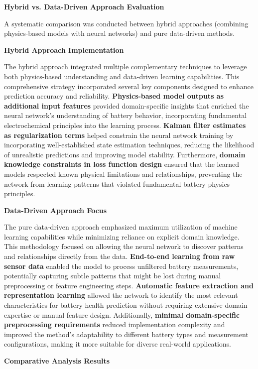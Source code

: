\textbf{Hybrid vs. Data-Driven Approach Evaluation}

A systematic comparison was conducted between hybrid approaches (combining physics-based models with neural networks) and pure data-driven methods.

\textbf{Hybrid Approach Implementation}

The hybrid approach integrated multiple complementary techniques to leverage both physics-based understanding and data-driven learning capabilities. This comprehensive strategy incorporated several key components designed to enhance prediction accuracy and reliability. \textbf{Physics-based model outputs as additional input features} provided domain-specific insights that enriched the neural network's understanding of battery behavior, incorporating fundamental electrochemical principles into the learning process. \textbf{Kalman filter estimates as regularization terms} helped constrain the neural network training by incorporating well-established state estimation techniques, reducing the likelihood of unrealistic predictions and improving model stability. Furthermore, \textbf{domain knowledge constraints in loss function design} ensured that the learned models respected known physical limitations and relationships, preventing the network from learning patterns that violated fundamental battery physics principles.

\textbf{Data-Driven Approach Focus}

The pure data-driven approach emphasized maximum utilization of machine learning capabilities while minimizing reliance on explicit domain knowledge. This methodology focused on allowing the neural network to discover patterns and relationships directly from the data. \textbf{End-to-end learning from raw sensor data} enabled the model to process unfiltered battery measurements, potentially capturing subtle patterns that might be lost during manual preprocessing or feature engineering steps. \textbf{Automatic feature extraction and representation learning} allowed the network to identify the most relevant characteristics for battery health prediction without requiring extensive domain expertise or manual feature design. Additionally, \textbf{minimal domain-specific preprocessing requirements} reduced implementation complexity and improved the method's adaptability to different battery types and measurement configurations, making it more suitable for diverse real-world applications.

\textbf{Comparative Analysis Results}

